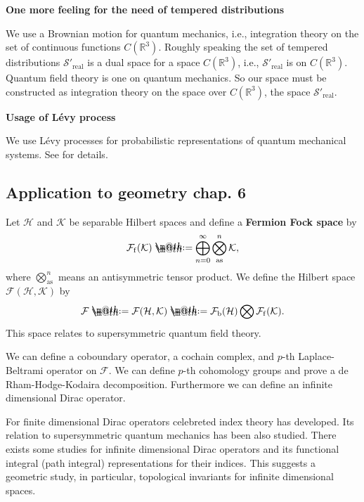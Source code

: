 \documentclass[openany, a4paper, oneside]{book}
\makeatletter
\newcommand*{\defeq}{\mathrel{\rlap{%
\raisebox{0.3ex}{$\m@th\cdot$}}%
\raisebox{-0.3ex}{$\m@th\cdot$}}%
=}
\theoremstyle{break}
\theoremstyle{breakdefn}
\newcommand{\bbR}{\mathbb{R}}
\newcommand{\calF}{\mathcal{F}}
\newcommand{\calFb}{\mathcal{F}_{\mathrm{b}}}
\newcommand{\calFf}{\mathcal{F}_{\mathrm{f}}}
\newcommand{\calH}{\mathcal{H}}
\newcommand{\calK}{\mathcal{K}}
\newcommand{\realtempereddist}{\mathcal{S}'_{\mathrm{real}}}
\makeatother
\begin{document}
\vspace{1em}

\textbf{One more feeling for the need of tempered distributions}

We use a Brownian motion for quantum mechanics, i.e.,
integration theory on the set of continuous functions $C (\bbR^3)$.
Roughly speaking the set of tempered distributions $\realtempereddist$ is a dual space for a space $C (\bbR^3)$,
i.e., $\realtempereddist$ is on $C (\bbR^3)$.
Quantum field theory is one on quantum mechanics.
So our space must be constructed as integration theory on the space over $C (\bbR^3)$, the space $\realtempereddist$.

\vspace{1em}

\textbf{Usage of L\'evy process}

We use L\'evy processes for probabilistic representations of quantum mechanical systems.
See \cite{LorincziHiroshimaBetz1} for details.
\subsection{Application to geometry \cite{AsaoArai1} chap. 6}
\label{sec-8-2-1-2}

Let $\calH$ and $\calK$ be separable Hilbert spaces
and define a \textbf{Fermion Fock space} by
\begin{align}
 \calFf (\calK)
 \defeq
 \bigoplus_{n=0}^{\infty} \bigotimes_{\mathrm{as}}^n \calK,
\end{align}
where $\bigotimes_{\mathrm{as}}^n$ means an antisymmetric tensor product.
We define the Hilbert space $\calF (\calH, \calK)$ by
\begin{align}
 \calF \defeq \calF (\calH, \calK) \defeq \calFb (\calH) \bigotimes \calFf (\calK).
\end{align}
This space relates to supersymmetric quantum field theory.

We can define a coboundary operator, a cochain complex,
and $p$-th Laplace-Beltrami operator on $\calF$.
We can define $p$-th cohomology groups
and prove a de Rham-Hodge-Kodaira decomposition.
Furthermore we can define an infinite dimensional Dirac operator.

For finite dimensional Dirac operators celebreted index theory has developed.
Its relation to supersymmetric quantum mechanics has been also studied.
There exists some studies for infinite dimensional Dirac operators
and its functional integral (path integral) representations
for their indices.
This suggests a geometric study, in particular, topological invariants for infinite dimensional spaces.
\end{document}
